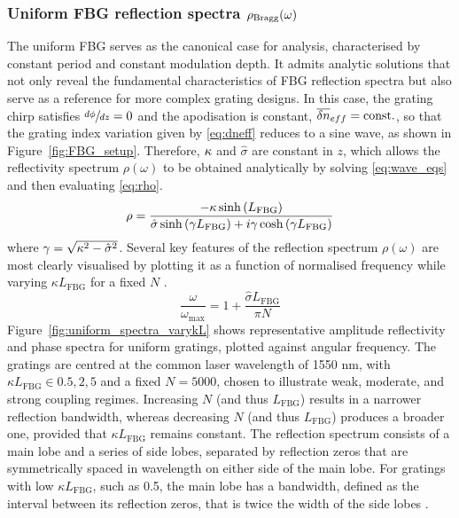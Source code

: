 \subsubsection*{Uniform FBG reflection spectra $\rho_\text{Bragg}(\omega)$}
\label{subsubsec:FBG_feedback}
%
The uniform FBG serves as the canonical case for analysis, characterised by constant period and constant modulation depth.
It admits analytic solutions that not only reveal the fundamental characteristics of FBG reflection spectra but also serve as a reference for more complex grating designs.
In this case, the grating chirp satisfies $\sfrac{d\phi}{dz} = 0$ and the apodisation is constant, $\overline{\delta n}_{eff} = \text{const.}$, so that the grating index variation given by \eqref{eq:dneff} reduces to a sine wave, as shown in Figure~\ref{fig:FBG_setup}.
Therefore, $\kappa$ and $\hat{\sigma}$ are constant in $z$, which allows the reflectivity spectrum $\rho(\omega)$ to be obtained analytically by solving \eqref{eq:wave_eqs} and then evaluating \eqref{eq:rho}.
%
\begin{equation}
\label{eq:uniform_rho}
    \rho = \frac{-\kappa \sinh\left( L_\text{FBG}\right)}{\hat{\sigma} \sinh\left(\gamma L_\text{FBG}\right) + i\gamma \cosh\left(\gamma L_\text{FBG}\right)}
\end{equation}
%
where $\gamma = \sqrt{\kappa^2 - \hat{\sigma}^2}$. Several key features of the reflection spectrum $\rho(\omega)$ are most clearly visualised by plotting it as a function of normalised frequency while varying $\kappa L_\text{FBG}$ for a fixed $N$ \cite{erdogan1997fiber}.
%
\begin{equation*}
    \frac{\omega}{\omega_\text{max}} = 1 + \frac{\hat{\sigma} L_\text{FBG}  }{\pi N}
\end{equation*}
%
Figure~\ref{fig:uniform_spectra_varykL} shows representative amplitude reflectivity and phase spectra for uniform gratings, plotted against angular frequency. 
The gratings are centred at the common laser wavelength of 1550 nm, with $\kappa L_\text{FBG} \in {0.5, 2, 5}$ and a fixed $N = 5000$, chosen to illustrate weak, moderate, and strong coupling regimes.
Increasing $N$ (and thus $L_\text{FBG}$) results in a narrower reflection bandwidth, whereas decreasing $N$ (and thus $L_\text{FBG}$) produces a broader one, provided that $\kappa L_\text{FBG}$ remains constant.
The reflection spectrum consists of a main lobe and a series of side lobes, separated by reflection zeros that are symmetrically spaced in wavelength on either side of the main lobe.
For gratings with low $\kappa L_\text{FBG}$, such as 0.5, the main lobe has a bandwidth, defined as the interval between its reflection zeros, that is twice the width of the side lobes \cite{erdogan1997fiber}.
